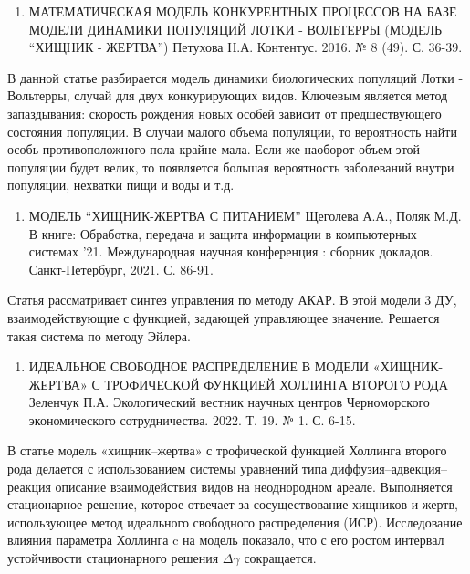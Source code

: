 \documentclass[
  13pt,
  fontsize=13pt,
  russian,
  a4paper,
,captions=tableheading
]{scrreprt}
\providecommand{\tightlist}{%
  \setlength{\itemsep}{0pt}\setlength{\parskip}{0pt}}
\begin{document}
\begin{enumerate}
\def\labelenumi{\arabic{enumi}.}
\setcounter{enumi}{1}
\tightlist
\item
  МАТЕМАТИЧЕСКАЯ МОДЕЛЬ КОНКУРЕНТНЫХ ПРОЦЕССОВ НА БАЗЕ МОДЕЛИ ДИНАМИКИ
  ПОПУЛЯЦИЙ ЛОТКИ - ВОЛЬТЕРРЫ (МОДЕЛЬ ``ХИЩНИК - ЖЕРТВА'') Петухова Н.А.
  Контентус. 2016. № 8 (49). С. 36-39.
\end{enumerate}

В данной статье разбирается модель динамики биологических популяций
Лотки - Вольтерры, случай для двух конкурирующих видов. Ключевым
является метод запаздывания: скорость рождения новых особей зависит от
предшествующего состояния популяции. В случаи малого объема популяции,
то вероятность найти особь противоположного пола крайне мала. Если же
наоборот объем этой популяции будет велик, то появляется большая
вероятность заболеваний внутри популяции, нехватки пищи и воды и т.д.

\begin{enumerate}
\def\labelenumi{\arabic{enumi}.}
\setcounter{enumi}{2}
\tightlist
\item
  МОДЕЛЬ ``ХИЩНИК-ЖЕРТВА С ПИТАНИЕМ'' Щеголева А.А., Поляк М.Д. В книге:
  Обработка, передача и защита информации в компьютерных системах '21.
  Международная научная конференция : сборник докладов. Санкт-Петербург,
  2021. С. 86-91.
\end{enumerate}

Статья рассматривает синтез управления по методу АКАР. В этой модели 3
ДУ, взаимодействующие с функцией, задающей управляющее значение.
Решается такая система по методу Эйлера.

\begin{enumerate}
\def\labelenumi{\arabic{enumi}.}
\setcounter{enumi}{3}
\tightlist
\item
  ИДЕАЛЬНОЕ СВОБОДНОЕ РАСПРЕДЕЛЕНИЕ В МОДЕЛИ «ХИЩНИК-ЖЕРТВА» С
  ТРОФИЧЕСКОЙ ФУНКЦИЕЙ ХОЛЛИНГА ВТОРОГО РОДА Зеленчук П.А. Экологический
  вестник научных центров Черноморского экономического сотрудничества.
  2022. Т. 19. № 1. С. 6-15.
\end{enumerate}

В статье модель «хищник--жертва» с трофической функцией Холлинга второго
рода делается с использованием системы уравнений типа
диффузия--адвекция--реакция описание взаимодействия видов на
неоднородном ареале. Выполняется стационарное решение, которое отвечает
за сосуществование хищников и жертв, использующее метод идеального
свободного распределения (ИСР). Исследование влияния параметра Холлинга
c на модель показало, что с его ростом интервал устойчивости
стационарного решения \(\Delta \gamma\) сокращается.
\end{document}
